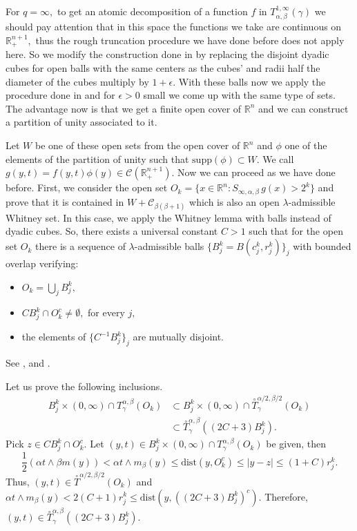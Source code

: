 \documentclass[leqno,11pt]{amsart}
\theoremstyle{plain}
\theoremstyle{remark}
\begin{document}
{{{    {For $q=\infty,$ to get an atomic decomposition of a function $f$ in $T^{1,\infty}_{\alpha, \beta}(\gamma)$ we should pay attention that in this space the functions we take are continuous on $\mathbb{R}^{n+1}_+,$ thus the rough truncation procedure we have done before does not apply here. So we modify the construction done in \cite{MNP} by replacing the disjoint dyadic cubes for open balls with the same centers as the cubes' and radii half the diameter of the cubes multiply by $1+\epsilon.$ With these balls now we apply the procedure done in \cite{MNP} and for $\epsilon > 0$ small we come up with the same type of sets. The advantage now is that we get a finite open cover of $\mathbb{R}^n$ and we can construct a partition of unity associated to it.}
    
    {Let $W$ be one of these open sets from the open cover of $\mathbb{R}^n$ and $\phi$ one of the elements of the partition of unity such that $\text{supp}(\phi)\subset W.$ We call $g(y,t)=f(y,t)\phi(y)\in \mathscr{C}(\mathbb{R}^{n+1}_+).$ Now we can proceed as we have done before. First, we consider the open set $O_k=\{x\in \mathbb{R}^n: S_{\infty, \alpha, \beta}\,  g(x)>2^k\}$ and prove that it is contained in $W+\mathscr{C}_{\beta (\beta+1)}$ which is also an open $\lambda$-admissible Whitney set. In this case, we apply the Whitney lemma with balls instead of dyadic cubes. So, there exists a universal constant $C>1$ such that for the open set $O_k$ there is a sequence of $\lambda$-admissible balls $\{B_j^k=B(c_j^k,r_j^k)\}_j$ with bounded overlap verifying:
   \begin{itemize}
\item $O_k=\bigcup_j B_j^k,$
\item $C B_j^k \cap O_k^c\ne \emptyset,$ for every $j,$
\item the elements of $\{C^{-1}B_j^k\}_j$ are mutually disjoint.
   \end{itemize}
   See \cite[Theoreme 1.3, Chapitre III.1]{CW}, and \cite{artur}.}
 
   Let us prove the following inclusions.
   \begin{align}
B_j^k\times (0,\infty)\cap T_\gamma^{\alpha, \beta}(O_k)&\subset B_j^k\times (0,\infty)\cap \overset{\circ}{T}_\gamma^{\alpha/2,\beta/2}(O_k)\\ &\subset \overset{\circ}{T}_\gamma^{\alpha, \beta}((2C+3)B_j^k).\nonumber
   \end{align}
   Pick $z\in C B_j^k\cap O_k^c.$ Let $(y,t)\in B_j^k\times (0,\infty)\cap T_\gamma^{\alpha, \beta}(O_k)$ be given, then \begin{equation*}
\frac{1}{2}(\alpha t \wedge \beta m(y))<\alpha t \wedge m_\beta (y)\le \text{dist}(y,O_k^c)\le |y-z|\le (1+C)r_j^k. 
   \end{equation*}
  Thus, $(y,t)\in \overset{\circ}{T}^{\alpha/2, \beta/2}(O_k)$ and $\alpha t \wedge m_\beta(y)< 2 (C+1)r_j^k\le \text{dist}(y,((2C+3)B_j^k)^c).$
   Therefore, $(y,t)\in \overset{\circ}{T}_\gamma^{\alpha, \beta}((2C+3)B_j^k).$ 

}}}
\end{document}
